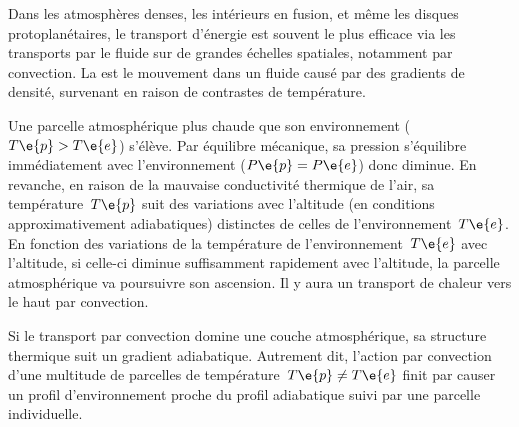 
\sk
Dans les atmosphères denses, les intérieurs en fusion, et même les disques protoplanétaires, le transport d'énergie est souvent le plus efficace via les transports par le fluide sur de grandes échelles spatiales, notamment par convection. La  est le mouvement dans un fluide causé par des gradients de densité, survenant en raison de contrastes de température.

\sk
Une parcelle atmosphérique plus chaude que son environnement ($T\e{p}>T\e{e}$) s'élève. Par équilibre mécanique, sa pression s'équilibre immédiatement avec l'environnement ($P\e{p}=P\e{e}$) donc diminue. En revanche, en raison de la mauvaise conductivité thermique de l'air, sa température~$T\e{p}$ suit des variations avec l'altitude (en conditions approximativement adiabatiques) distinctes de celles de l'environnement~$T\e{e}$. En fonction des variations de la température de l'environnement~$T\e{e}$ avec l'altitude, si celle-ci diminue suffisamment rapidement avec l'altitude, la parcelle atmosphérique va poursuivre son ascension. Il y aura un transport de chaleur vers le haut par convection.

\sk
Si le transport par convection domine une couche atmosphérique, sa structure thermique suit un gradient adiabatique. Autrement dit, l'action par convection d'une multitude de parcelles de température~$T\e{p} \neq T\e{e}$ finit par causer un profil d'environnement proche du profil adiabatique suivi par une parcelle individuelle.
